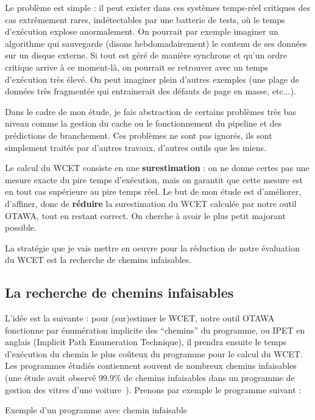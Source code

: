 \documentclass[french]{article}
\begin{document}
  Le problème est simple : il peut exister dans ces systèmes temps-réel critiques des cas extrêmement rares, indétectables par une batterie de tests, où le temps d'exécution explose anormalement. On pourrait par exemple imaginer un algorithme qui sauvegarde (disons hebdomadairement) le contenu de ses données sur un disque externe. Si tout est géré de manière synchrone et qu'un ordre critique arrive à ce moment-là, on pourrait se retrouver avec un temps d'exécution très élevé. On peut imaginer plein d'autres exemples (une plage de données très fragmentée qui entrainerait des défauts de page en masse, etc...).

  Dans le cadre de mon étude, je fais abstraction de certains problèmes très bas niveau comme la gestion du cache ou le fonctionnement du pipeline et des prédictions de branchement. Ces problèmes ne sont pas ignorés, ils sont simplement traités par d'autres travaux, d'autres outils que les miens.

  Le calcul du WCET consiste en une \textbf{surestimation} : on ne donne certes pas une mesure exacte du pire temps d'exécution, mais on garantit que cette mesure est en tout cas supérieure au pire temps réel. Le but de mon étude est d'améliorer, d'affiner, donc de \textbf{réduire} la surestimation du WCET calculée par notre outil OTAWA, tout en restant correct. On cherche à avoir le plus petit majorant possible.

  La stratégie que je vais mettre en oeuvre pour la réduction de notre évaluation du WCET est la recherche de chemins infaisables.

  \subsection{La recherche de chemins infaisables}
  L'idée est la suivante : pour (sur)estimer le WCET, notre outil OTAWA fonctionne par énumération implicite des ``chemins'' du programme, ou IPET en anglais (Implicit Path Enumeration Technique), il prendra ensuite le temps d'exécution du chemin le plus coûteux du programme pour le calcul du WCET. Les programmes étudiés contiennent souvent de nombreux chemins infaisables (une étude avait observé 99.9\% de chemins infaisables dans un programme de gestion des vitres d'une voiture~\cite{wcet05}). Prenons par exemple le programme suivant :

  \begin{algorithm}
    \label{alg:1}
    \caption{Exemple d'un programme avec chemin infaisable}
  \end{algorithm}
\end{document}
